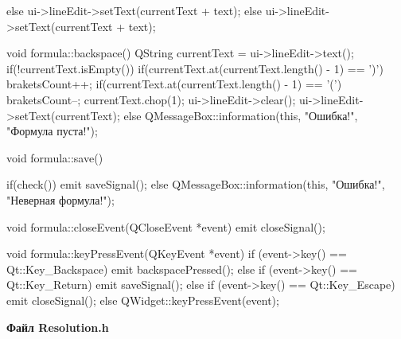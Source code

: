 \documentclass[12pt, a4paper]{article}
\begin{document}
\begin{cppcode}[caption = Файл Formula.cpp]
{{{	  			}
	  			else{
	  				ui->lineEdit->setText(currentText + text);
	  			}
	  		}
	  		else {
	  			ui->lineEdit->setText(currentText + text);
	  		}
	  	}
	  	
	  	void formula::backspace()
	  	{
	  		QString currentText = ui->lineEdit->text();
	  		if(!currentText.isEmpty()){
	  			if(currentText.at(currentText.length() - 1) == ')') braketsCount++;
	  			if(currentText.at(currentText.length() - 1) == '(') braketsCount--;
	  			currentText.chop(1);
	  			ui->lineEdit->clear();
	  			ui->lineEdit->setText(currentText);
	  		}
	  		else{
	  			QMessageBox::information(this, "Ошибка!", "Формула пуста!");
	  		}
	  	}
	  	
	  	void formula::save()
	  	{
	  		if(check()){
	  			emit saveSignal();
	  		}
	  		else{
	  			QMessageBox::information(this, "Ошибка!", "Неверная формула!");
	  		}
	  		
	  	}
	  	
	  	void formula::closeEvent(QCloseEvent *event)
	  	{
	  		emit closeSignal();
	  	}
	  	
	  	void formula::keyPressEvent(QKeyEvent *event)
	  	{
	  		if (event->key() == Qt::Key_Backspace) {
	  			emit backspacePressed();
	  		}
	  		else if (event->key() == Qt::Key_Return){
	  			emit saveSignal();
	  		}
	  		else if (event->key() == Qt::Key_Escape){
	  			emit closeSignal();
	  		}
	  		else {
	  			QWidget::keyPressEvent(event);
	  		}
	  	}
	  	
	  \end{cppcode}
	  \begin{center}
	  	\textbf{Файл Resolution.h}
	  \end{center}
\end{document}
